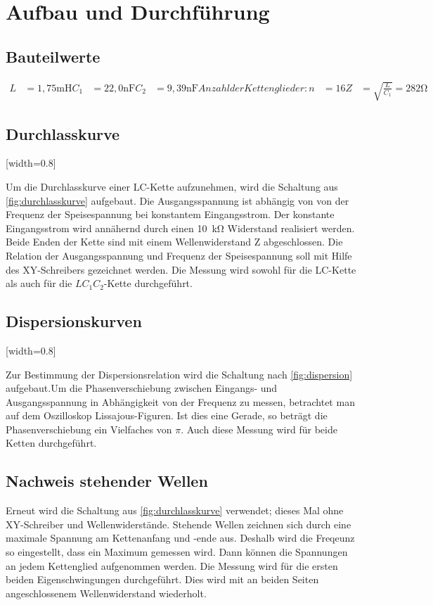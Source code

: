\section{Aufbau und Durchführung}
\label{sec:Durchführung}

\subsection{Bauteilwerte}
\begin{align}
L &= 1,75 \si{\milli\henry}
C_{1} &= 22,0 \si{\nano\farad}
C_{2} &= 9,39 \si{\nano\farad}
Anzahl der Kettenglieder: n &= 16
Z &= \sqrt{\frac{L}{C_{1}}} = 282 \si{\ohm}
\end{align}

\subsection{Durchlasskurve}

[width=0.8\textwidth]

Um die Durchlasskurve einer LC-Kette aufzunehmen, wird die Schaltung aus \ref{fig:durchlasskurve}
aufgebaut. Die Ausgangsspannung ist abhängig von von der Frequenz der Speisespannung bei konstantem Eingangsstrom. Der konstante Eingangsstrom wird annähernd durch einen \SI{10}{\kilo\ohm} Widerstand realisiert werden. Beide Enden der Kette sind mit einem Wellenwiderstand Z abgeschlossen. Die Relation der Ausgangsspannung und Frequenz der Speisespannung soll mit Hilfe des XY-Schreibers gezeichnet werden.
Die Messung wird sowohl für die LC-Kette als auch für die $LC_{1}C_{2}$-Kette durchgeführt.

\subsection{Dispersionskurven}

[width=0.8\textwidth]

Zur Bestimmung der Dispersionsrelation wird die Schaltung nach \ref{fig:dispersion} aufgebaut.Um die Phasenverschiebung zwischen Eingangs- und Ausgangsspannung in Abhängigkeit von der Frequenz zu messen, betrachtet man auf dem Oszilloskop Lissajous-Figuren. Ist dies eine Gerade, so beträgt die Phasenverschiebung ein Vielfaches von $\pi$. Auch diese Messung wird für beide Ketten durchgeführt.

\subsection{Nachweis stehender Wellen}
Erneut wird die Schaltung aus \ref{fig:durchlasskurve} verwendet; dieses Mal ohne XY-Schreiber und Wellenwiderstände. Stehende Wellen zeichnen sich durch eine maximale Spannung am Kettenanfang und -ende aus. Deshalb wird die Freqeunz so eingestellt, dass ein Maximum gemessen wird. Dann können die Spannungen an jedem Kettenglied aufgenommen werden. Die Messung wird für die ersten beiden Eigenschwingungen durchgeführt.
Dies wird mit an beiden Seiten angeschlossenem Wellenwiderstand wiederholt.

